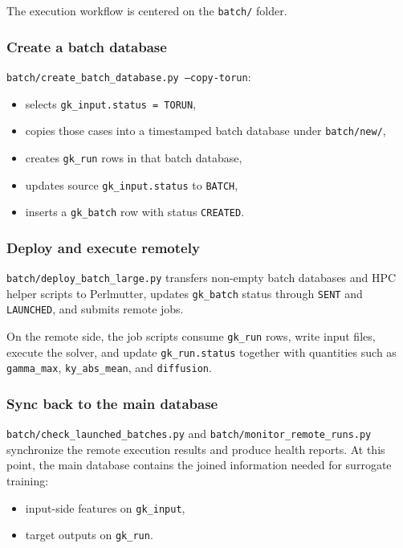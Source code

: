 \documentclass[11pt]{article}
\newcommand{\code}[1]{\texttt{#1}}
\begin{document}
The execution workflow is centered on the \code{batch/} folder.

\subsubsection{Create a batch database}

\code{batch/create\_batch\_database.py --copy-torun}:

\begin{itemize}
\item selects \code{gk\_input.status = TORUN},
\item copies those cases into a timestamped batch database under
\code{batch/new/},
\item creates \code{gk\_run} rows in that batch database,
\item updates source \code{gk\_input.status} to \code{BATCH},
\item inserts a \code{gk\_batch} row with status \code{CREATED}.
\end{itemize}

\subsubsection{Deploy and execute remotely}

\code{batch/deploy\_batch\_large.py} transfers non-empty batch databases and
HPC helper scripts to Perlmutter, updates \code{gk\_batch} status through
\code{SENT} and \code{LAUNCHED}, and submits remote jobs.

On the remote side, the job scripts consume \code{gk\_run} rows, write input
files, execute the solver, and update \code{gk\_run.status} together with
quantities such as \code{gamma\_max}, \code{ky\_abs\_mean}, and
\code{diffusion}.

\subsubsection{Sync back to the main database}

\code{batch/check\_launched\_batches.py} and
\code{batch/monitor\_remote\_runs.py} synchronize the remote execution results
and produce health reports. At this point, the main database contains the
joined information needed for surrogate training:

\begin{itemize}
\item input-side features on \code{gk\_input},
\item target outputs on \code{gk\_run}.
\end{itemize}
\end{document}
